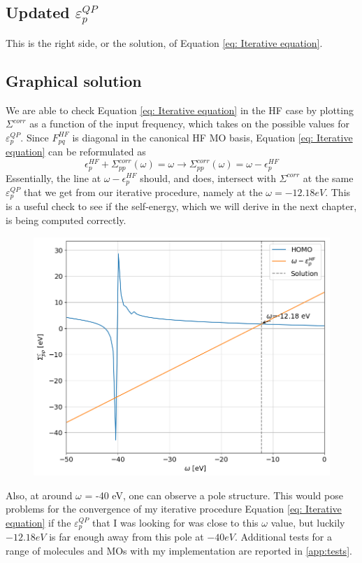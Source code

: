 \documentclass[12pt]{caltech_thesis}
\begin{document}
\subsection{Updated $\varepsilon_{p}^{QP}$}
This is the right side, or the solution, of Equation \ref{eq: Iterative equation}.
\newpage
\subsection{Graphical solution}
We are able to check Equation \ref{eq: Iterative equation} in the HF case by plotting $\Sigma^{corr}$ as a function of the input frequency, which takes on  the possible values for $\varepsilon_{p}^{QP}$. Since $F_{pq}^{HF}$ is diagonal in the canonical HF MO basis, Equation \ref{eq: Iterative equation} can be reformulated as
\begin{equation}
    \epsilon _{p}^{HF} + \Sigma_{pp}^{corr}(\omega) = \omega  \rightarrow \Sigma_{pp}^{corr}(\omega) = \omega  - \epsilon _{p}^{HF}
\end{equation}
Essentially, the line at $\omega - \epsilon_{p}^{HF}$ should, and does, intersect with $\Sigma^{corr}$ at the same $\varepsilon_{p}^{QP}$ that we get from our iterative procedure, namely at the $\omega = -12.18 eV$.
 This is a useful check to see if the self-energy, which we will derive in the next chapter, is being computed correctly.

\begin{figure}[h]
    \centering
    \includegraphics[width=\textwidth]{correlation_energies.png}
\end{figure}
Also, at around $\omega$ = -40 eV, one can observe a pole structure. This would pose problems for the convergence of my iterative procedure Equation \ref{eq: Iterative equation} if the $\varepsilon_{p}^{QP}$ that I was looking for was close to this $\omega $ value, but luckily $-12.18 eV$ is far enough away from this pole at $-40 eV$. Additional tests for a range of molecules and MOs with my implementation are reported in \ref{app:tests}.
\end{document}
